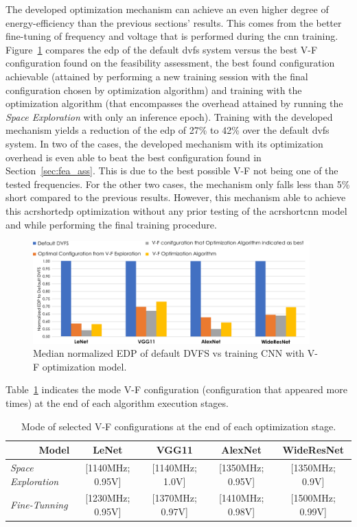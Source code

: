 The developed optimization mechanism can achieve an even higher degree of energy-efficiency than the previous sections' results. This comes from the better fine-tuning of frequency and voltage that is performed during the \acrshort{cnn} training. Figure~\ref{fig:Algori_comp} compares the \acrshort{edp} of the default \acrshort{dvfs} system versus the best V-F configuration found on the feasibility assessment, the best found configuration achievable (attained by performing a new training session with the final configuration chosen by optimization algorithm) and training with the optimization algorithm (that encompasses the overhead attained by running the \textit{Space Exploration} with only an inference epoch). Training with the developed mechanism yields a reduction of the \acrshort{edp} of 27\% to 42\% over the default \acrshort{dvfs} system. In two of the cases, the developed mechanism with its optimization overhead is even able to beat the best configuration found in Section~\ref{sec:fea_ass}. This is due to the best possible V-F not being one of the tested frequencies. For the other two cases, the mechanism only falls less than 5\% short compared to the previous results. However, this mechanism able to achieve this acrshort{edp} optimization without any prior testing of the acrshort{cnn} model and while performing the final training procedure.
\begin{figure}[htb]
    \centering
        \includegraphics[width=0.95\textwidth]{Figures/Application To Deep Learning/Algorithm_Opt_comp.pdf}
        \caption{Median normalized EDP of default DVFS vs training CNN with V-F optimization model.}
    \label{fig:Algori_comp}
\end{figure}

Table~\ref{tab:bestVF} indicates the mode V-F configuration (configuration that appeared more times) at the end of each algorithm execution stages.

\begin{table}[htb]
    \centering
    \label{tab:bestVF}
    \begin{tabular}{lcccc}
        \multicolumn{1}{r}{{\textbf{Model}}} &  \textbf{LeNet} & \textbf{VGG11} &\textbf{AlexNet} & \textbf{WideResNet} \\ \hline
        \textit{Space Exploration} &  [1140MHz; 0.95V] & [1140MHz; 1.0V] & [1350MHz; 0.95V]  & [1350MHz; 0.9V]\\
        \textit{Fine-Tunning} &  [1230MHz; 0.95V] & [1370MHz; 0.97V] & [1410MHz; 0.98V]  &[1500MHz; 0.99V]\\ \hline
    \end{tabular}%
     \caption{Mode of selected V-F configurations at the end of each optimization stage.}
\end{table}



